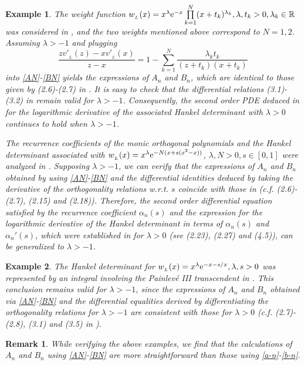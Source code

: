 \documentclass[12pt,a4paper]{article}    %
\newtheorem{remark}{Remark}
\newcommand{\e}{{\rm e}}
\newtheorem{exm}{Example}
\numberwithin{equation}{section}
\begin{document}
\begin{exm}
The weight function $w_{_L}(x)=x^{\lambda}\e^{-x}\prod\limits_{k=1}^N(x+t_k)^{\lambda_k},\lambda,t_k>0, \lambda_k\in\mathbb{R}$ was considered in \cite{MuLyu2024}, and the two weights mentioned above correspond to $N=1,2$. Assuming $\lambda>-1$ and plugging
\[\frac{zv'_{_L}(z)-xv'_{_L}(x)}{z-x}=1-\sum_{k=1}^N\frac{\lambda_kt_k}{(z+t_k)(x+t_k)}\] into \eqref{AN}-\eqref{BN} yields the expressions of $A_n$ and $B_n$, which are identical to those given by (2.6)-(2.7) in \cite{MuLyu2024}. It is easy to check that the differential relations (3.1)-(3.2) in \cite{MuLyu2024} remain valid for $\lambda>-1$. Consequently, the second order PDE deduced in \cite{MuLyu2024} for the logarithmic derivative of the associated Hankel determinant with $\lambda>0$ continues to hold when $\lambda>-1$.

The recurrence coefficients of the monic orthogonal polynomials and the Hankel determinant associated with $w_{_L}(x)=x^{\lambda}\e^{-N(x+s(x^2-x))}$, $\lambda,N>0,s\in[0,1]$ were analyzed in \cite{HanChen17}. Supposing $\lambda>-1$, we can verify that the expressions of $A_n$ and $B_n$ obtained by using \eqref{AN}-\eqref{BN} and the differential identities deduced by taking the derivative of the orthogonality relations w.r.t. $s$ coincide with those in \cite{HanChen17} (c.f. (2.6)-(2.7), (2.15) and (2.18)). Therefore, the second order differential equation satisfied by the recurrence coefficient $\alpha_n(s)$ and the expression for the logarithmic derivative of the Hankel determinant in terms of $\alpha_n(s)$ and $\alpha_n'(s)$, which were established in \cite{HanChen17} for $\lambda>0$ (see (2.23), (2.27) and (4.5)), can be generalized to $\lambda>-1$.
\end{exm}

\begin{exm}
The Hankel determinant for  $w_{_{L}}(x)=x^{\lambda}\e^{-x-s/x},\lambda,s>0$ was represented by an integral involving the Painlev\'{e} III transcendent in \cite{ChenIts2010}. This conclusion remains valid for $\lambda>-1$, since the expressions of $A_n$ and $B_n$ obtained via \eqref{AN}-\eqref{BN} and the differential equalities derived by differentiating the orthogonality relations for $\lambda>-1$ are consistent with those for $\lambda>0$ (c.f. (2.7)-(2.8), (3.1) and (3.5) in \cite{ChenIts2010}).
\end{exm}


\begin{remark}
While verifying the above examples, we find that the calculations of $A_n$ and $B_n$ using \eqref{AN}-\eqref{BN} are more straightforward than those using \eqref{a-n}-\eqref{b-n}.
\end{remark}
\end{document}

